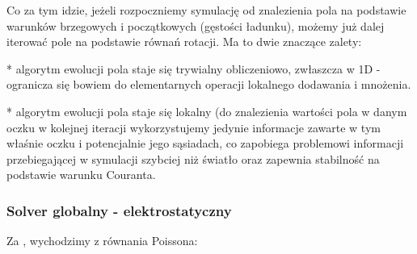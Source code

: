 Co za tym idzie, jeżeli rozpoczniemy symulację od znalezienia pola na
podstawie warunków brzegowych i początkowych (gęstości ładunku), możemy już
dalej iterować pole na podstawie równań rotacji. Ma to dwie znaczące
zalety:

* algorytm ewolucji pola staje się trywialny obliczeniowo,
zwłaszcza w 1D - ogranicza się bowiem do elementarnych operacji lokalnego
dodawania i mnożenia.

* algorytm ewolucji pola staje się lokalny (do
znalezienia wartości pola w danym oczku w kolejnej iteracji wykorzystujemy
jedynie informacje zawarte w tym właśnie oczku i potencjalnie jego
sąsiadach, co zapobiega
problemowi informacji przebiegającej w symulacji szybciej niż światło oraz
zapewnia stabilność na podstawie warunku Couranta.


%
%
%


\subsubsection{Solver globalny - elektrostatyczny}
Za \cite{birdsall}, wychodzimy z równania Poissona:
